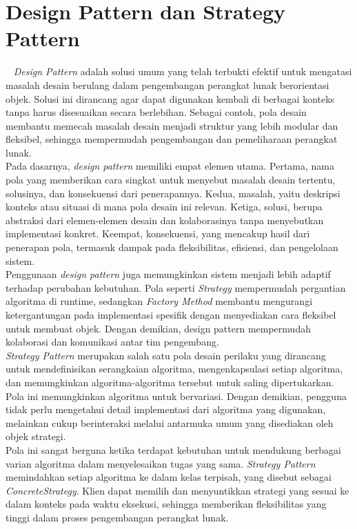 \section{Design Pattern dan Strategy Pattern}
\label{sec:designpattern}
~\cite{Gamma:94:design}
\textit{Design Pattern} adalah solusi umum yang telah terbukti efektif untuk mengatasi masalah desain berulang dalam pengembangan perangkat lunak berorientasi objek. Solusi ini dirancang agar dapat digunakan kembali di berbagai konteks tanpa harus disesuaikan secara berlebihan. Sebagai contoh, pola desain membantu memecah masalah desain menjadi struktur yang lebih modular dan fleksibel, sehingga mempermudah pengembangan dan pemeliharaan perangkat lunak.
\\
Pada dasarnya, \textit{design pattern} memiliki empat elemen utama. Pertama, nama pola yang memberikan cara singkat untuk menyebut masalah desain tertentu, solusinya, dan konsekuensi dari penerapannya. Kedua, masalah, yaitu deskripsi konteks atau situasi di mana pola desain ini relevan. Ketiga, solusi, berupa abstraksi dari elemen-elemen desain dan kolaborasinya tanpa menyebutkan implementasi konkret. Keempat, konsekuensi, yang mencakup hasil dari penerapan pola, termasuk dampak pada fleksibilitas, efisiensi, dan pengelolaan sistem.
\\
Penggunaan \textit{design pattern} juga memungkinkan sistem menjadi lebih adaptif terhadap perubahan kebutuhan. Pola seperti \textit{Strategy} mempermudah pergantian algoritma di runtime, sedangkan \textit{Factory Method} membantu mengurangi ketergantungan pada implementasi spesifik dengan menyediakan cara fleksibel untuk membuat objek. Dengan demikian, design pattern mempermudah kolaborasi dan komunikasi antar tim pengembang.
\\
\textit{Strategy Pattern} merupakan salah satu pola desain perilaku yang dirancang untuk mendefinisikan serangkaian algoritma, mengenkapsulasi setiap algoritma, dan memungkinkan algoritma-algoritma tersebut untuk saling dipertukarkan. Pola ini memungkinkan algoritma untuk bervariasi. Dengan demikian, pengguna tidak perlu mengetahui detail implementasi dari algoritma yang digunakan, melainkan cukup berinteraksi melalui antarmuka umum yang disediakan oleh objek strategi.
\\
Pola ini sangat berguna ketika terdapat kebutuhan untuk mendukung berbagai varian algoritma dalam menyelesaikan tugas yang sama. \textit{Strategy Pattern} memindahkan setiap algoritma ke dalam kelas terpisah, yang disebut sebagai \textit{ConcreteStrategy}. Klien dapat memilih dan menyuntikkan strategi yang sesuai ke dalam konteks pada waktu eksekusi, sehingga memberikan fleksibilitas yang tinggi dalam proses pengembangan perangkat lunak.
